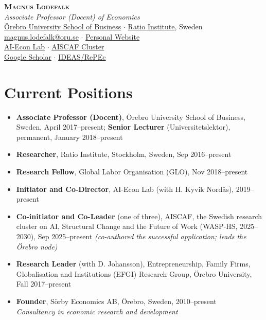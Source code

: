 \documentclass[11pt,a4paper]{article}
\newcommand{\cventry}[1]{\item #1}
\begin{document}
\begin{center}
  {\LARGE\bfseries\scshape Magnus Lodefalk}\\[6pt]
  \textit{Associate Professor (Docent) of Economics}\\[4pt]
  \href{https://www.oru.se/english/employee/magnus_lodefalk}{Örebro University School of Business} $\cdot$ \href{https://www.ratio.se/medarbetare/magnus-lodefalk/}{Ratio Institute}, Sweden\\[4pt]
  \href{mailto:magnus.lodefalk@oru.se}{magnus.lodefalk@oru.se} $\cdot$
  \href{https://sites.google.com/view/magnuslodefalk}{Personal Website}\\[4pt]
  \href{https://www.ai-econlab.com}{AI-Econ Lab} $\cdot$
  \href{https://www.aiscaf.se}{AISCAF Cluster}\\[4pt]
  \href{https://scholar.google.com/citations?user=z0WQ2JcAAAAJ}{Google Scholar} $\cdot$
  \href{https://ideas.repec.org/f/plo250.html}{IDEAS/RePEc}
\end{center}

\vspace{6pt}

\section{Current Positions}

\begin{itemize}
  \cventry{\textbf{Associate Professor (Docent)}, Örebro University School of Business, Sweden, April 2017--present; \textbf{Senior Lecturer} (Universitetslektor), permanent, January 2018--present}
  \cventry{\textbf{Researcher}, Ratio Institute, Stockholm, Sweden, Sep 2016--present}
  \cventry{\textbf{Research Fellow}, Global Labor Organisation (GLO), Nov 2018--present}
\cventry{\textbf{Initiator and Co-Director}, AI-Econ Lab (with H. Kyvik Nordås), 2019--present}
  
\cventry{\textbf{Co-initiator and Co-Leader} (one of three), AISCAF, the Swedish research cluster on AI, Structural Change and the Future of Work (WASP-HS, 2025--2030), Sep 2025--present \textit{(co-authored the successful application; leads the Örebro node)}}
\cventry{\textbf{Research Leader} (with D. Johansson), Entrepreneurship, Family Firms, Globalisation and Institutions (EFGI) Research Group, Örebro University, Fall 2017--present}
  \cventry{\textbf{Founder}, Sörby Economics AB, Örebro, Sweden, 2010--present\\
  \textit{Consultancy in economic research and development}}
\end{itemize}
\end{document}
